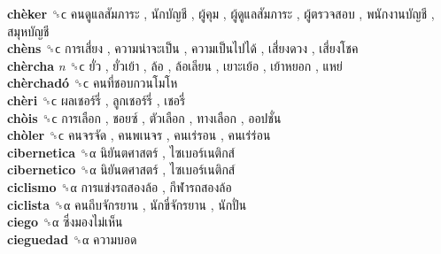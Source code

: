 \textbf{chèker} ␝ϲ   คนดูแลสัมภาระ ,  นักบัญชี ,  ผู้คุม ,  ผู้ดูแลสัมภาระ ,  ผู้ตรวจสอบ ,  พนักงานบัญชี ,  สมุหบัญชี   \\
\textbf{chèns} ␝ϲ   การเสี่ยง ,  ความน่าจะเป็น ,  ความเป็นไปได้ ,  เสี่ยงดวง ,  เสี่ยงโชค   \\
\textbf{chèrcha} \emph{n}  ␝ϲ   ยั่ว ,  ยั่วเย้า ,  ล้อ ,  ล้อเลียน ,  เยาะเย้อ ,  เย้าหยอก ,  แหย่   \\
\textbf{chèrchadó} ␝ϲ   คนที่ชอบกวนโมโห   \\
\textbf{chèri} ␝ϲ   ผลเชอร์รี่ ,  ลูกเชอร์รี่ ,  เชอรี่   \\
\textbf{chòis} ␝ϲ   การเลือก ,  ชอยซ์ ,  ตัวเลือก ,  ทางเลือก ,  ออปชั่น   \\
\textbf{chòler} ␝ϲ   คนจรจัด ,  คนพเนจร ,  คนเร่รอน ,  คนเร่ร่อน   \\
\textbf{cibernetica} ␝α   นิยันตศาสตร์ ,  ไซเบอร์เนติกส์   \\
\textbf{cibernetico} ␝α   นิยันตศาสตร์ ,  ไซเบอร์เนติกส์   \\
\textbf{ciclismo} ␝α   การแข่งรถสองล้อ ,  กีฬารถสองล้อ   \\
\textbf{ciclista} ␝α   คนถีบจักรยาน ,  นักขี่จักรยาน ,  นักปั่น   \\
\textbf{ciego} ␝α   ซึ่งมองไม่เห็น   \\
\textbf{cieguedad} ␝α   ความบอด   \\
